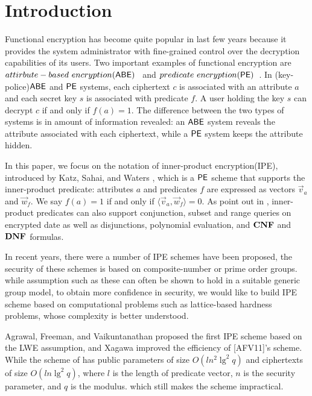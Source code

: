 \section{Introduction}
Functional encryption has become quite popular in last few years because it provides the system administrator with fine-grained control over the decryption capabilities of its users. Two important examples of functional encryption are $attirbute-based\ encryption(\ABE)$~\cite{EC:SahWat05, CCS:GPSW06} and $predicate\ encryption(\mathsf{PE})\\ $~\cite{TCC:BonWat07,
EC:KatSahWat08}. In (key-police)$\mathsf{ABE}$ and $\mathsf{PE}$ systems, each ciphertext $c$ is associated with an attribute $a$ and each secret key $s$ is associated with predicate $f$. A user holding the key $s$ can decrypt $c$ if and only if $f(a)=1$. The difference between the two types of systems is in amount of information revealed: an $\mathsf{ABE}$ system reveals the attribute associated with each ciphertext, while a $\mathsf{PE}$ system keeps the attribute hidden.\

In this paper, we focus on the notation of inner-product encryption(IPE), introduced by Katz, Sahai, and Waters \cite{EC:KatSahWat08}, which is a $\mathsf{PE}$ scheme that supports the inner-product predicate: attributes $a$ and predicates $f$ are expressed as vectors $\overrightarrow{v}_{a}$ and $\overrightarrow{w}_{f}$. We say $f(a)=1$ if and only if $\langle \overrightarrow{v}_{a}, \overrightarrow{w}_{f} \rangle=0$. As point out in  \cite{EC:KatSahWat08}, inner-product predicates can also support conjunction, subset and range queries on encrypted date\cite{TCC:BonWat07} as well as disjunctions, polynomial evaluation, and $\mathbf{CNF}$ and $\mathbf{DNF}$ formulas\cite{EC:KatSahWat08}.\

In recent years, there were a number of IPE schemes\cite{EC:KatSahWat08, AC:OkaTak09, EC:LOSTW10, C:OkaTak10, PKC:AttLib10, Park2011Inner, CANS:OkaTak11, EC:OkaTak12} have been proposed, the security of these schemes is based on composite-number or prime order groups. while assumption such as these can often be shown to hold in a suitable generic group model, to obtain more confidence in security, we would like to build IPE scheme based on computational problems such as lattice-based hardness problems, whose complexity is better understood.\

Agrawal, Freeman, and Vaikuntanathan\cite{AC:AgrFreVai11} proposed the first IPE scheme based on the LWE assumption, and Xagawa\cite{PKC:Xagawa13} improved the efficiency of [AFV11]'s scheme. While the scheme of \cite{PKC:Xagawa13} has public parameters of size $O(l n^{2}\lg^{2}q)$ and ciphertexts of size $O(l n\lg^{2}q)$, where $l$ is the length of predicate vector, $n$ is the security parameter, and $q$ is the modulus. which still makes the scheme impractical.


